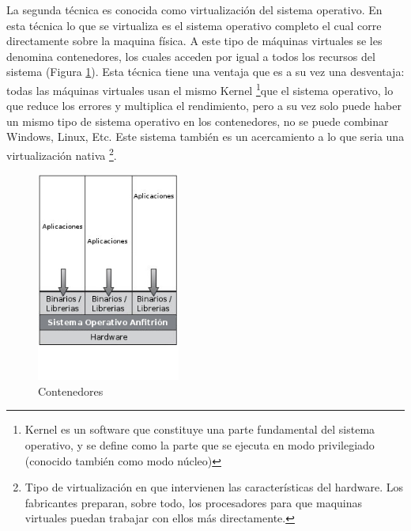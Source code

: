 \newpage
La segunda técnica es conocida como virtualización del sistema operativo. En esta técnica lo que se virtualiza es el sistema operativo completo el cual corre directamente sobre la maquina física. A este tipo de máquinas virtuales se les denomina contenedores, los cuales acceden por igual a todos los recursos del sistema (Figura \ref{fig:contenedores}). Esta técnica tiene una ventaja que es a su vez una desventaja: todas las máquinas virtuales usan el mismo Kernel \footnote{Kernel es un software que constituye una parte fundamental del sistema operativo, y se define como la parte que se ejecuta en modo privilegiado (conocido también como modo núcleo)}que el sistema operativo, lo que reduce los errores y multiplica el rendimiento, pero a su vez solo puede haber un mismo tipo de sistema operativo en los contenedores, no se puede combinar Windows, Linux, Etc. Este sistema también es un acercamiento a lo que seria una virtualización nativa \footnote{Tipo de virtualización en que intervienen las características del hardware. Los fabricantes preparan, sobre todo, los procesadores para que maquinas virtuales puedan trabajar con ellos más directamente.}.\\

\begin{figure}[h]
    \centering
	\caption{Contenedores}
	\label{fig:contenedores}
	\includegraphics[width = 0.42\textwidth]{../architecture/v1/diagrams/contenedores}
\end{figure}

